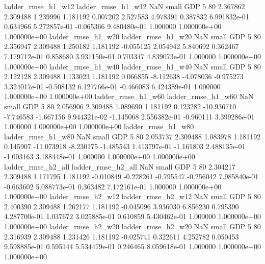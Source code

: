       ladder_rmse_h1_w12       ladder_rmse_h1_w12                   NaN      small      GDP                 5 80 2.367862       2.309488 1.239996       1.181192    0.007202      2.527583      4.978391     0.387832   6.991832e-01  0.634966 5.272857e-01    -0.065366   9.480480e-01            1.000000    1.000000e+00        1.000000e+00
      ladder_rmse_h1_w20       ladder_rmse_h1_w20                   NaN      small      GDP                 5 80 2.356947       2.309488 1.250182       1.181192   -0.055125      2.054942      5.840692     0.362467   7.179712e-01  0.858680 3.931150e-01     0.703347   4.839073e-01            1.000000    1.000000e+00        1.000000e+00
      ladder_rmse_h1_w40       ladder_rmse_h1_w40                   NaN      small      GDP                 5 80 2.122128       2.309488 1.133023       1.181192    0.066855     -8.112638     -4.078036    -0.975273   3.324017e-01 -0.508132 6.127766e-01    -0.466083   6.424389e-01            1.000000    1.000000e+00        1.000000e+00
      ladder_rmse_h1_w60       ladder_rmse_h1_w60                   NaN      small      GDP                 5 80 2.056906       2.309488 1.089690       1.181192    0.123282    -10.936710     -7.746583    -1.667156   9.944321e-02 -1.145068 2.556382e-01    -0.960111   3.399286e-01            1.000000    1.000000e+00        1.000000e+00
      ladder_rmse_h1_w80       ladder_rmse_h1_w80                   NaN      small      GDP                 5 80 2.053737       2.309488 1.083978       1.181192    0.145907    -11.073918     -8.230175    -1.485543   1.413797e-01 -1.161803 2.488135e-01    -1.003163   3.188448e-01            1.000000    1.000000e+00        1.000000e+00
      ladder_rmse_h2_all       ladder_rmse_h2_all                   NaN      small      GDP                 5 80 2.304217       2.309488 1.171795       1.181192   -0.010849     -0.228261     -0.795547    -0.256042   7.985840e-01 -0.663602 5.088773e-01     0.363482   7.172161e-01            1.000000    1.000000e+00        1.000000e+00
      ladder_rmse_h2_w12       ladder_rmse_h2_w12                   NaN      small      GDP                 5 80 2.400390       2.309488 1.262177       1.181192   -0.045096      3.936030      6.856230     0.795390   4.287700e-01  1.037672 3.025885e-01     0.610859   5.430462e-01            1.000000    1.000000e+00        1.000000e+00
      ladder_rmse_h2_w20       ladder_rmse_h2_w20                   NaN      small      GDP                 5 80 2.316939       2.309488 1.231426       1.181192   -0.025741      0.322611      4.252782     0.050453   9.598885e-01  0.595144 5.534479e-01     0.246465   8.059618e-01            1.000000    1.000000e+00        1.000000e+00
